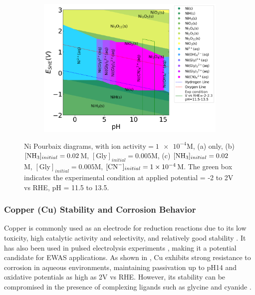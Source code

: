 \documentclass[journal=jacsat,manuscript=article]{achemso}
\begin{document}
\begin{figure}[htbp]
\begin{subfigure}[b]{0.32\textwidth}
    \end{subfigure}
    \hfill
    \begin{subfigure}[b]{0.32\textwidth}
        \subcaption{}\label{fig:Ni_Pourbaix_NH3_Gly_CN}
        \includegraphics[width=\textwidth]{Figures/pourbaix_diagrams/Ni-NH3-H2O_activity=1e-04_[NH3]=0.02M_[Gly]=0.005M_[CN]=0.0001.png}
    \end{subfigure}
    \caption{Ni Pourbaix diagrams, with $\text{ion activity}=\num{1e-4}$M, (a)  only, (b) $[\ce{NH3}]_{initial}= 0.02$M, $[\text{Gly}]_{initial}=0.005$M, (c) $[\ce{NH3}]_{initial}= 0.02$M, $[\text{Gly}]_{initial}=0.005$M,  $[\ce{CN-}]_{initial}=\num{1e-4}$M. The green box indicates the experimental condition at applied potential = -2 to 2V vs RHE, pH = 11.5 to 13.5.}
    \label{fig:Ni_Pourbaix}
\end{figure}


\subsubsection{Copper (Cu) Stability and Corrosion Behavior}

Copper is commonly used as an electrode for  reduction reactions due to its low toxicity, high catalytic activity and selectivity, and relatively good stability \cite{Hori1989FormationSolution, Hori1997ElectrochemicalElectrode, Ligt2023ElectrochemicalElectrodes, Deacon-Price2023SolventElectrodes, deRuiter2022ProbingSpectroscopy}. It has also been used in pulsed electrolysis experiments \cite{Mandal2018InvestigatingTime, Zhan2021RevealingSpectroscopy, Liu2021CO2Experiment, Dattila2020ActiveReduction}, making it a potential candidate for EWAS applications. As shown in , Cu exhibits strong resistance to corrosion in aqueous environments, maintaining passivation up to pH14 and oxidative potentials as high as 2V vs RHE. However, its stability can be compromised in the presence of complexing ligands such as glycine and cyanide \cite{Wang2022ThermodynamicDiagrams, Tripathi2009FundamentalConstituents, Skrypnikova2008PeculiaritiesAdditives, OConnor2018ElectrochemicalSolutions}.
\end{document}
